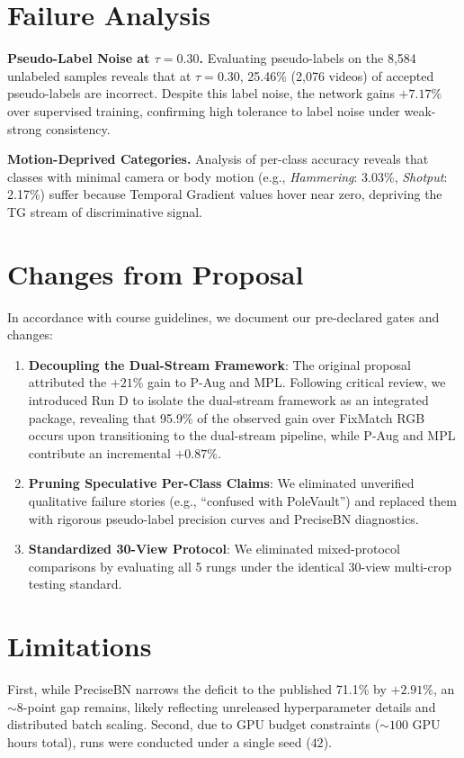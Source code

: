 \documentclass[10pt,twocolumn,letterpaper]{article}
\begin{document}
\section{Failure Analysis}
\label{sec:failure}
\textbf{Pseudo-Label Noise at $\tau = 0.30$.} Evaluating pseudo-labels on the 8,584 unlabeled samples reveals that at $\tau = 0.30$, 25.46\% (2,076 videos) of accepted pseudo-labels are incorrect. Despite this label noise, the network gains $+7.17\%$ over supervised training, confirming high tolerance to label noise under weak-strong consistency.

\textbf{Motion-Deprived Categories.} Analysis of per-class accuracy reveals that classes with minimal camera or body motion (e.g., \textit{Hammering}: 3.03\%, \textit{Shotput}: 2.17\%) suffer because Temporal Gradient values hover near zero, depriving the TG stream of discriminative signal.

\section{Changes from Proposal}
\label{sec:changes}
In accordance with course guidelines, we document our pre-declared gates and changes:
\begin{enumerate}
    \item \textbf{Decoupling the Dual-Stream Framework}: The original proposal attributed the $+21\%$ gain to P-Aug and MPL. Following critical review, we introduced Run D to isolate the dual-stream framework as an integrated package, revealing that 95.9\% of the observed gain over FixMatch RGB occurs upon transitioning to the dual-stream pipeline, while P-Aug and MPL contribute an incremental $+0.87\%$.
    \item \textbf{Pruning Speculative Per-Class Claims}: We eliminated unverified qualitative failure stories (e.g., ``confused with PoleVault'') and replaced them with rigorous pseudo-label precision curves and PreciseBN diagnostics.
    \item \textbf{Standardized 30-View Protocol}: We eliminated mixed-protocol comparisons by evaluating all 5 rungs under the identical 30-view multi-crop testing standard.
\end{enumerate}

\section{Limitations}
\label{sec:limitations}
First, while PreciseBN narrows the deficit to the published 71.1\% by $+2.91\%$, an $\sim 8$-point gap remains, likely reflecting unreleased hyperparameter details and distributed batch scaling. Second, due to GPU budget constraints ($\sim 100$ GPU hours total), runs were conducted under a single seed ($42$).
\end{document}

